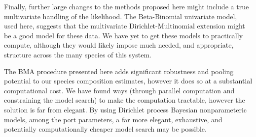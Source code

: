 \documentclass[12pt]{article}
\begin{document}
Finally, further large changes to the methods proposed here might
include a true multivariate handling of the likelihood. The
Beta-Binomial univariate model, used here, suggests that the
multivariate Dirichlet-Multinomial extension might be a good model for
these data. We have yet to get these models to practically compute,
although they would likely impose much needed, and appropriate,
structure across the many species of this system.

The BMA procedure presented here adds significant robustness and pooling
potential to our species composition estimates, however it does so at a
substantial computational cost. We have found ways (through parallel
computation and constraining the model search) to make the computation
tractable, however the solution is far from elegant. By using Dirichlet
process Bayesian nonparameteric models, among the port parameters, a far
more elegant, exhaustive, and potentially computationally cheaper model
search may be possible.
\end{document}
